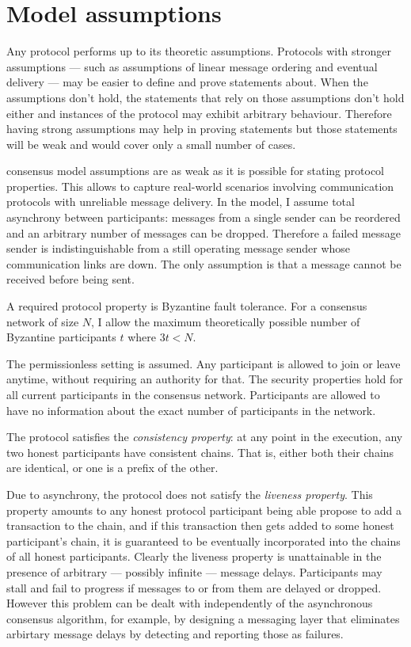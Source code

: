 \documentclass[a4paper,11pt]{article}
\begin{document}
\section{Model assumptions}\label{sec:assumptions}

Any protocol performs up to its theoretic assumptions. Protocols with stronger assumptions --- such
as assumptions of linear message ordering and eventual delivery --- may be easier to define and
prove statements about. When the assumptions don't hold, the statements that rely on those
assumptions don't hold either and instances of the protocol may exhibit arbitrary
behaviour. Therefore having strong assumptions may help in proving statements but those statements
will be weak and would cover only a small number of cases.

consensus model assumptions are as weak as it is possible for stating protocol
properties. This allows to capture real-world scenarios involving communication protocols with
unreliable message delivery. In the model, I assume total asynchrony between participants: messages
from a single sender can be reordered and an arbitrary number of messages can be dropped. Therefore
a failed message sender is indistinguishable from a still operating message sender whose
communication links are down. The only assumption is that a message cannot be received before being
sent.

A required protocol property is Byzantine fault tolerance. For a consensus network of size $N$, I
allow the maximum theoretically possible number of Byzantine participants $t$ where $3t < N$.

The permissionless setting is assumed. Any participant is allowed to join or leave anytime, without
requiring an authority for that. The security properties hold for all current participants in the
consensus network. Participants are allowed to have no information about the exact number of
participants in the network.

The protocol satisfies the \emph{consistency property}: at any point in the execution, any two
honest participants have consistent chains. That is, either both their chains are identical, or one
is a prefix of the other.

Due to asynchrony, the protocol does not satisfy the \emph{liveness property}. This property amounts
to any honest protocol participant being able propose to add a transaction to the chain, and if this
transaction then gets added to some honest participant's chain, it is guaranteed to be eventually
incorporated into the chains of all honest participants. Clearly the liveness property is
unattainable in the presence of arbitrary --- possibly infinite --- message delays. Participants may
stall and fail to progress if messages to or from them are delayed or dropped. However this problem
can be dealt with independently of the asynchronous consensus algorithm, for example, by designing a
messaging layer that eliminates arbirtary message delays by detecting and reporting those as
failures.
\end{document}
